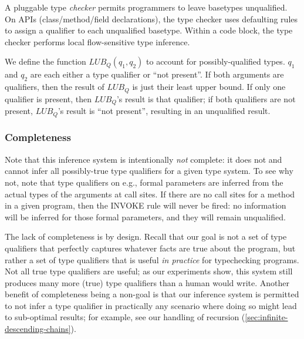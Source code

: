 A pluggable type \emph{checker} permits programmers to leave basetypes unqualified.
On APIs (class/method/field declarations), the type checker uses defaulting
rules to assign a qualifier to each unqualified basetype.
Within a code block, the type checker performs local flow-sensitive type
inference.

We define the function $\mathit{LUB_Q}(q_1, q_2)$ to account for possibly-qualified types.
$q_1$ and $q_2$ are each either a type qualifier or ``not present''.
If both arguments are qualifiers, then the result of $\mathit{LUB_Q}$
is just their least upper bound. If only one qualifier is present, then $\mathit{LUB_Q}$'s result
is that qualifier; if both qualifiers are not present, $\mathit{LUB_Q}$'s result is ``not present'',
resulting in an unqualified result.




\subsubsection{Completeness}
\label{sec:complete}

Note that this inference system is intentionally \emph{not} complete: it
does not and cannot infer all possibly-true type qualifiers for a given type
system. To see why not, note that type qualifiers on e.g., formal parameters
are inferred from the actual types of the arguments at call sites. If there
are no call sites for a method in a given program, then the \textsc{INVOKE}
rule will never be fired: no information will be inferred for those formal
parameters, and they will remain unqualified.

The lack of completeness is by design. Recall that our goal is not a
set of type qualifiers that perfectly captures whatever facts are true
about the program, but rather a set of type qualifiers that is useful
\emph{in practice} for typechecking programs. Not all true type qualifiers
are useful; as our experiments show, this system still produces many more
(true) type qualifiers than a human would write.  Another benefit of completeness being a non-goal
is that our inference system is permitted to not infer a type qualifier
in practically any scenario where doing so might lead to sub-optimal results;
for example, see our handling of recursion (\cref{sec:infinite-descending-chains}).

